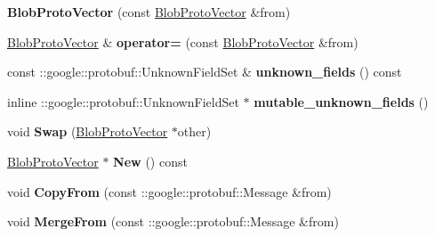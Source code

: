 \begin{DoxyCompactItemize}
\mbox{\label{classcaffe_1_1_blob_proto_vector_aa6e9a4f4d896f00f229ad3030601e340}} 
{\bfseries Blob\+Proto\+Vector} (const \mbox{\hyperlink{classcaffe_1_1_blob_proto_vector}{Blob\+Proto\+Vector}} \&from)
\item 
\mbox{\label{classcaffe_1_1_blob_proto_vector_a9e27131cc492c9aaeaa38fb8126936ae}} 
\mbox{\hyperlink{classcaffe_1_1_blob_proto_vector}{Blob\+Proto\+Vector}} \& {\bfseries operator=} (const \mbox{\hyperlink{classcaffe_1_1_blob_proto_vector}{Blob\+Proto\+Vector}} \&from)
\item 
\mbox{\label{classcaffe_1_1_blob_proto_vector_a6cfa159b7cf3e3b80a06fe8d7607984c}} 
const \+::google\+::protobuf\+::\+Unknown\+Field\+Set \& {\bfseries unknown\+\_\+fields} () const
\item 
\mbox{\label{classcaffe_1_1_blob_proto_vector_af35d4c83a70b072dff3a797d166bb950}} 
inline \+::google\+::protobuf\+::\+Unknown\+Field\+Set $\ast$ {\bfseries mutable\+\_\+unknown\+\_\+fields} ()
\item 
\mbox{\label{classcaffe_1_1_blob_proto_vector_a788b3a63d8f9eda6e3f3d29141bb6ac7}} 
void {\bfseries Swap} (\mbox{\hyperlink{classcaffe_1_1_blob_proto_vector}{Blob\+Proto\+Vector}} $\ast$other)
\item 
\mbox{\label{classcaffe_1_1_blob_proto_vector_a5137a69990301cfcb95ec1b9a6647e58}} 
\mbox{\hyperlink{classcaffe_1_1_blob_proto_vector}{Blob\+Proto\+Vector}} $\ast$ {\bfseries New} () const
\item 
\mbox{\label{classcaffe_1_1_blob_proto_vector_af473f29a9221698c05e5e5ff991856dd}} 
void {\bfseries Copy\+From} (const \+::google\+::protobuf\+::\+Message \&from)
\item 
\mbox{\label{classcaffe_1_1_blob_proto_vector_aff32f9ed8ead8853633a095a1f31ff04}} 
void {\bfseries Merge\+From} (const \+::google\+::protobuf\+::\+Message \&from)
\item 
\mbox{\label{classcaffe_1_1_blob_proto_vector_a4ea3ec65507f51580d1e655c8bb95bde}} 

\end{DoxyCompactItemize}
